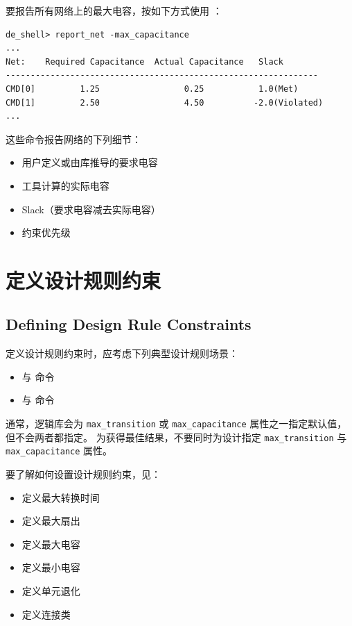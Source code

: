 要报告所有网络上的最大电容，按如下方式使用 ：
\begin{lstlisting}
de_shell> report_net -max_capacitance
...
Net:    Required Capacitance  Actual Capacitance   Slack
---------------------------------------------------------------
CMD[0]         1.25                 0.25           1.0(Met)
CMD[1]         2.50                 4.50          -2.0(Violated)
...
\end{lstlisting}

这些命令报告网络的下列细节：
\begin{itemize}
  \item 用户定义或由库推导的要求电容
  \item 工具计算的实际电容
  \item Slack（要求电容减去实际电容）
\end{itemize}

\begin{seeAlsoBox}
\begin{itemize}
  \item 约束优先级
\end{itemize}
\end{seeAlsoBox}

\section{定义设计规则约束}
\subsection*{Defining Design Rule Constraints}

定义设计规则约束时，应考虑下列典型设计规则场景：
\begin{itemize}
  \item {} 与  命令
  \item {} 与  命令
\end{itemize}

通常，逻辑库会为 \texttt{max\_transition} 或 \texttt{max\_capacitance} 属性之一指定默认值，但不会两者都指定。
为获得最佳结果，不要同时为设计指定 \texttt{max\_transition} 与 \texttt{max\_capacitance} 属性。

要了解如何设置设计规则约束，见：
\begin{itemize}
  \item 定义最大转换时间
  \item 定义最大扇出
  \item 定义最大电容
  \item 定义最小电容
  \item 定义单元退化
  \item 定义连接类
\end{itemize}

